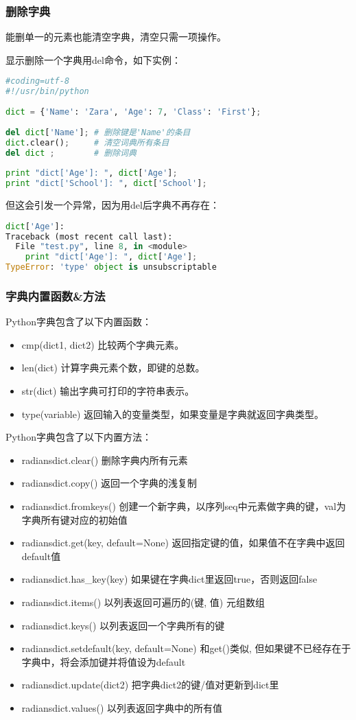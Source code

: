 \subsubsection{删除字典}
能删单一的元素也能清空字典，清空只需一项操作。

显示删除一个字典用del命令，如下实例：
\begin{lstlisting}[language=Python]
#coding=utf-8
#!/usr/bin/python
 
dict = {'Name': 'Zara', 'Age': 7, 'Class': 'First'};
 
del dict['Name']; # 删除键是'Name'的条目
dict.clear();     # 清空词典所有条目
del dict ;        # 删除词典
 
print "dict['Age']: ", dict['Age'];
print "dict['School']: ", dict['School'];
\end{lstlisting}
但这会引发一个异常，因为用del后字典不再存在：
\begin{lstlisting}[language=Python]
dict['Age']:
Traceback (most recent call last):
  File "test.py", line 8, in <module>
    print "dict['Age']: ", dict['Age'];
TypeError: 'type' object is unsubscriptable
\end{lstlisting}


\subsubsection{字典内置函数\&方法}
Python字典包含了以下内置函数：
\begin{itemize}
\item 	cmp(dict1, dict2)
比较两个字典元素。
\item len(dict)
计算字典元素个数，即键的总数。
\item	str(dict)
输出字典可打印的字符串表示。
\item	type(variable)
返回输入的变量类型，如果变量是字典就返回字典类型。
\end{itemize}


Python字典包含了以下内置方法：
\begin{itemize}
\item 	radiansdict.clear()
删除字典内所有元素
\item	radiansdict.copy()
返回一个字典的浅复制
\item	radiansdict.fromkeys()
创建一个新字典，以序列seq中元素做字典的键，val为字典所有键对应的初始值
\item	radiansdict.get(key, default=None)
返回指定键的值，如果值不在字典中返回default值
\item	radiansdict.has\_key(key)
如果键在字典dict里返回true，否则返回false
\item	radiansdict.items()
以列表返回可遍历的(键, 值) 元组数组
\item	radiansdict.keys()
以列表返回一个字典所有的键
\item	radiansdict.setdefault(key, default=None)
和get()类似, 但如果键不已经存在于字典中，将会添加键并将值设为default
\item	radiansdict.update(dict2)
把字典dict2的键/值对更新到dict里
\item	radiansdict.values()
以列表返回字典中的所有值
\end{itemize}






